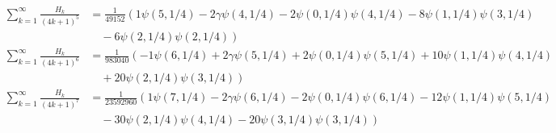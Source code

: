 \documentclass{article}
\theoremstyle{definition}
\begin{document}
\begin{align}
\sum_{k=1}^\infty \frac{H_k}{(4k+1)^5} &= \frac{ 1}{49152}\left(  1\psi(5,1/4) -2\gamma\psi(4,1/4) -2\psi(0,1/4)\psi(4,1/4) -8\psi(1,1/4)\psi(3,1/4)  \right. \nonumber \\ &\left. \hspace{1em}
-6\psi(2,1/4)\psi(2,1/4)\right) \\
\sum_{k=1}^\infty \frac{H_k}{(4k+1)^6} &= \frac{1}{983040}\left( -1\psi(6,1/4) +2\gamma\psi(5,1/4) +2\psi(0,1/4)\psi(5,1/4) +10\psi(1,1/4)\psi(4,1/4)  \right. \nonumber \\ &\left. \hspace{1em}
+20\psi(2,1/4)\psi(3,1/4)\right) \\
\sum_{k=1}^\infty \frac{H_k}{(4k+1)^7} &= \frac{ 1}{23592960}\left(  1\psi(7,1/4) -2\gamma\psi(6,1/4) -2\psi(0,1/4)\psi(6,1/4) -12\psi(1,1/4)\psi(5,1/4)  \right. \nonumber \\ &\left. \hspace{1em}
-30\psi(2,1/4)\psi(4,1/4) -20\psi(3,1/4)\psi(3,1/4)\right)
\end{align}
 
\end{document}
